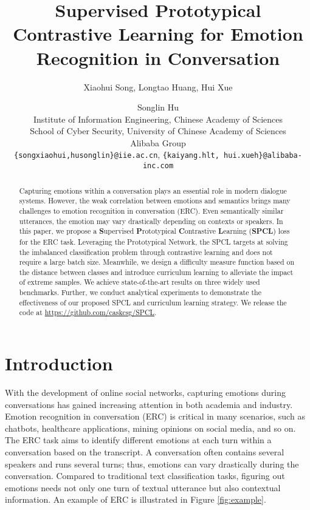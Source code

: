 \documentclass[11pt]{article}
\title{Supervised Prototypical Contrastive Learning for Emotion Recognition in Conversation}
\author{Xiaohui Song, Longtao Huang, Hui Xue \and Songlin Hu \\
Institute of Information Engineering, Chinese Academy of Sciences\\ 
School of Cyber Security, University of Chinese Academy of Sciences \\
Alibaba Group \\
  \texttt{\{songxiaohui,husonglin\}@iie.ac.cn}, \texttt{\{kaiyang.hlt, hui.xueh\}@alibaba-inc.com}
}
\begin{document}
\maketitle
\begin{abstract}
Capturing emotions within a conversation plays an essential role in modern dialogue systems. However, the weak correlation between emotions and semantics brings many challenges to emotion recognition in conversation (ERC). Even semantically similar utterances, the emotion may vary drastically depending on contexts or speakers. In this paper, we propose a \textbf{S}upervised \textbf{P}rototypical \textbf{C}ontrastive \textbf{L}earning (\textbf{SPCL}) loss for the ERC task. Leveraging the Prototypical Network, the SPCL targets at solving the imbalanced classification problem through contrastive learning and does not require a large batch size. Meanwhile, we design a difficulty measure function based on the distance between classes and introduce curriculum learning to alleviate the impact of extreme samples. We achieve state-of-the-art results on three widely used benchmarks. Further, we conduct analytical experiments to demonstrate the effectiveness of our proposed SPCL and curriculum learning strategy. We release the code at \href{https://github.com/caskcsg/SPCL}{https://github.com/caskcsg/SPCL}.

\let\thefootnote\relax{}
\let\thefootnote\relax{}

\end{abstract}
 
\section{Introduction}

With the development of online social networks, capturing emotions during conversations has gained increasing attention in both academia and industry\citep{li2020multi,shen2021directed,wang2020contextualized,ghosal2020cosmic, song2022emotionflow,zhu2021topic}. Emotion recognition in conversation (ERC) is critical in many scenarios, such as chatbots, healthcare applications, mining opinions on social media, and so on\citep{poria2019emotion}. The ERC task aims to identify different emotions at each turn within a conversation based on the transcript. A conversation often contains several speakers and runs several turns; thus, emotions can vary drastically during the conversation. Compared to traditional text classification tasks, figuring out emotions needs not only one turn of textual utterance but also contextual information. An example of ERC is illustrated in Figure \ref{fig:example}.
\end{document}
